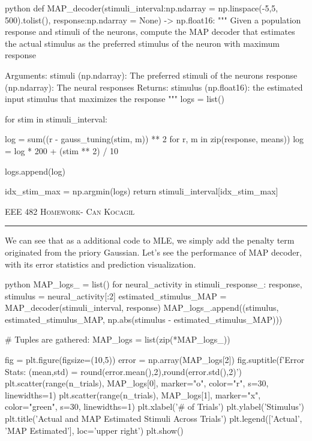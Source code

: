 \documentclass[12pt]{amsart}
\begin{document}
\begin{mintedbox}{python}
def MAP_decoder(stimuli_interval:np.ndarray = np.linspace(-5,5, 500).tolist(),
                response:np.ndarray = None) -> np.float16:
    """
    Given a population response and  stimuli of the
    neurons, compute the MAP decoder that 
    estimates the actual stimulus as the preferred
    stimulus of the neuron with maximum response

        Arguments:
            stimuli  (np.ndarray): The preferred stimuli of the neurons
            response (np.ndarray): The neural responses
        Returns:
            stimulus (np.float16): the estimated input stimulus that maximizes the response
    """
    logs = list()

    for stim in stimuli_interval:
       
        log = sum((r - gauss_tuning(stim, m)) ** 2 for r, m in zip(response, means))
        log = log * 200 + (stim ** 2) / 10 
        
        logs.append(log)

    idx_stim_max = np.argmin(logs)
    return stimuli_interval[idx_stim_max]
\end{mintedbox}



\newpage
{\scshape EEE 482} \hfill {\scshape \large  Homework-\relax} \hfill {\scshape Can Kocagil}
\smallskip
\hrule
\vspace{2mm}

We can see that as a additional code to MLE, we simply add the penalty term originated from the priory Gaussian. Let's see the performance of MAP decoder, with its error statistics and prediction visualization.


\begin{mintedbox}{python}
MAP_logs_ = list()
for neural_activity in stimuli_response_:
    response, stimulus = neural_activity[:2]
    estimated_stimulus_MAP = MAP_decoder(stimuli_interval, response)
    MAP_logs_.append((stimulus, estimated_stimulus_MAP, np.abs(stimulus - estimated_stimulus_MAP)))
    
# Tuples are gathered:
MAP_logs = list(zip(*MAP_logs_))

fig = plt.figure(figsize=(10,5))
error = np.array(MAP_logs[2])
fig.suptitle(f'Error Stats: (mean,std) = {round(error.mean(),2),round(error.std(),2)}')
plt.scatter(range(n_trials), MAP_logs[0], marker="o", color="r", s=30, linewidths=1)
plt.scatter(range(n_trials), MAP_logs[1], marker="x", color="green", s=30, linewidths=1)
plt.xlabel('# of Trials')
plt.ylabel('Stimulus')
plt.title('Actual and MAP Estimated Stimuli Across Trials')
plt.legend(['Actual', 'MAP Estimated'], loc='upper right')
plt.show()
\end{mintedbox}
\end{document}
